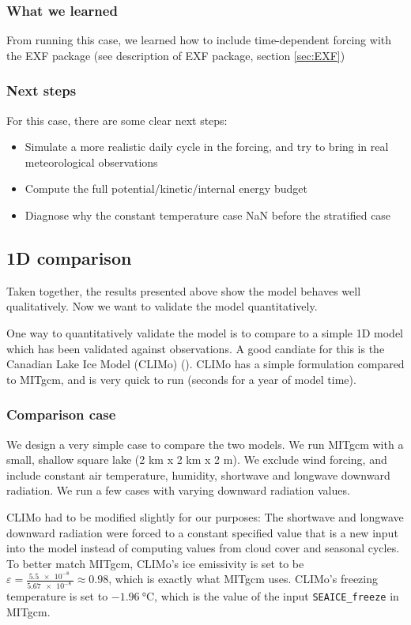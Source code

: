 \documentclass[11pt]{article}
\begin{document}
\subsubsection{What we learned}
From running this case, we learned how to include time-dependent forcing with the EXF package (see description of EXF package, section \ref{sec:EXF})

\subsubsection{Next steps}
For this case, there are some clear next steps:
\begin{itemize}
\item{Simulate a more realistic daily cycle in the forcing, and try to bring in real meteorological observations}
\item{Compute the full potential/kinetic/internal energy budget}
\item{Diagnose why the constant temperature case NaN before the stratified case}
\end{itemize}

\subsection{1D comparison}
\label{sec:CLIMo}
Taken together, the results presented above show the model behaves well qualitatively. Now we want to validate the model quantitatively.

One way to quantitatively validate the model is to compare to a simple 1D model which has been validated against observations. A good candiate for this is the Canadian Lake Ice Model (CLIMo) (\cite{Duguay2003}). CLIMo has a simple formulation compared to MITgcm, and is very quick to run (seconds for a year of model time).

\subsubsection{Comparison case}
We design a very simple case to compare the two models. We run MITgcm with a small, shallow square lake (2 km x 2 km x 2 m). We exclude wind forcing, and include constant air temperature, humidity, shortwave and longwave downward radiation. We run a few cases with varying downward radiation values.

CLIMo had to be modified slightly for our purposes: The shortwave and longwave downward radiation were forced to a constant specified value that is a new input into the model instead of computing values from cloud cover and seasonal cycles. To better match MITgcm, CLIMo's ice emissivity is set to be $\varepsilon = \frac{\SI{5.5e-8}{}}{\SI{5.67e-8}{}} \approx 0.98$, which is exactly what MITgcm uses. CLIMo's freezing temperature is set to $\SI{-1.96}{\celsius}$, which is the value of the input \verb|SEAICE_freeze| in MITgcm.
\end{document}

